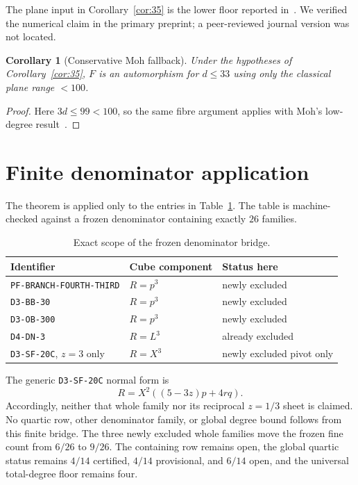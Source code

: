 \documentclass[11pt]{article}
\newtheorem{corollary}[theorem]{Corollary}
\begin{document}
The plane input in Corollary~\ref{cor:35} is the lower floor reported
in~\cite{GGHV}.  We verified the numerical claim in the primary
preprint; a peer-reviewed journal version was not located.

\begin{corollary}[Conservative Moh fallback]
Under the hypotheses of Corollary~\ref{cor:35}, \(F\) is an
automorphism for \(d\le33\) using only the classical plane range
\(<100\).
\end{corollary}

\begin{proof}
Here \(3d\le99<100\), so the same fibre argument applies with
Moh's low-degree result~\cite{Moh}.
\end{proof}

\section{Finite denominator application}

The theorem is applied only to the entries in Table~\ref{tab:bridge}.
The table is machine-checked against a frozen denominator containing
exactly \(26\) families.

\begin{table}[h]
\centering
\begin{tabular}{lll}
\toprule
Identifier & Cube component & Status here\\
\midrule
\texttt{PF-BRANCH-FOURTH-THIRD} & \(R=p^3\) & newly excluded\\
\texttt{D3-BB-30} & \(R=p^3\) & newly excluded\\
\texttt{D3-OB-300} & \(R=p^3\) & newly excluded\\
\texttt{D4-DN-3} & \(R=L^3\) & already excluded\\
\texttt{D3-SF-20C}, \(z=3\) only & \(R=X^3\) &
newly excluded pivot only\\
\bottomrule
\end{tabular}
\caption{Exact scope of the frozen denominator bridge.}
\label{tab:bridge}
\end{table}

The generic \texttt{D3-SF-20C} normal form is
\[
R=X^2((5-3z)p+4rq).
\]
Accordingly, neither that whole family nor its reciprocal \(z=1/3\)
sheet is claimed.  No quartic row, other denominator family, or global
degree bound follows from this finite bridge.  The three newly excluded
whole families move the frozen fine count from \(6/26\) to \(9/26\).
The containing row remains open, the global quartic status remains
\(4/14\) certified, \(4/14\) provisional, and \(6/14\) open, and the
universal total-degree floor remains four.
\end{document}
